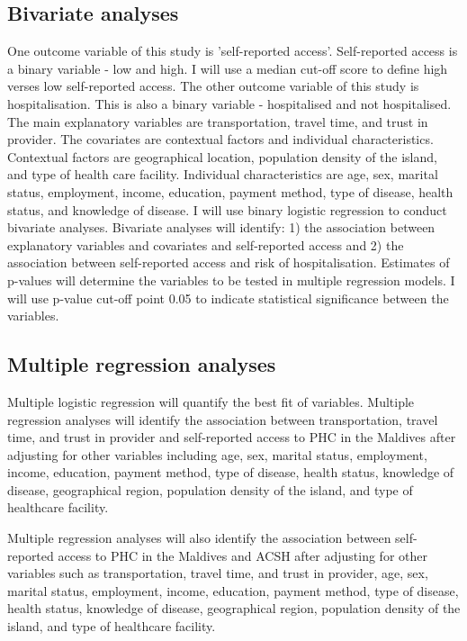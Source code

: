 \subsection{Bivariate  analyses}

One outcome variable of this study is 'self-reported access'. Self-reported access is a binary variable - low and high. I will use a median cut-off score to define high verses low self-reported access. The other outcome variable of this study is hospitalisation. This is also a binary variable - hospitalised and not hospitalised. The main explanatory variables are transportation, travel time, and trust in provider. The covariates are contextual factors and individual characteristics. Contextual factors are geographical location, population density of the island, and type of health care facility. Individual characteristics are age, sex, marital status, employment, income, education, payment method, type of disease, health status, and knowledge of disease. I will use binary logistic regression to conduct bivariate analyses. Bivariate analyses will identify: 1) the association between explanatory variables and covariates and self-reported access and 2) the association between self-reported access and risk of hospitalisation. Estimates of p-values will determine the variables to be tested in multiple regression models. I will use p-value cut-off point 0.05 to indicate statistical significance between the variables. 


\subsection{Multiple regression analyses}

Multiple logistic regression will quantify the best fit of variables. Multiple regression analyses will identify the association between transportation, travel time, and trust in provider and self-reported access to PHC in the Maldives after adjusting for other variables including age, sex, marital status, employment, income, education, payment method, type of disease, health status, knowledge of disease, geographical region, population density of the island, and type of healthcare facility. 

Multiple regression analyses will also identify the association between self-reported access to PHC in the Maldives and ACSH after adjusting for other variables such as transportation, travel time, and trust in provider, age, sex, marital status, employment, income, education, payment method, type of disease, health status, knowledge of disease, geographical region, population density of the island, and type of healthcare facility. 

